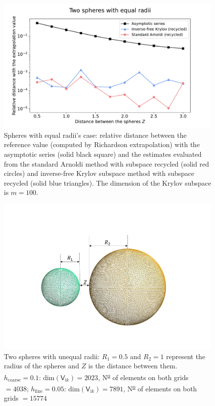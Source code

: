 \begin{figure}[H]
    \centering
    \includegraphics[scale = 0.5]{figures/relative_distance_equal_radii.pdf}
    \caption{Spheres with equal radii's case: relative distance between the reference value (computed by Richardson extrapolation) with the asymptotic series (solid black square)  
    and the estimates evaluated from the standard Arnoldi method with subspace recycled (solid red circles) and inverse-free Krylov subspace method 
    with subspace recycled (solid blue triangles). The dimension of the Krylov subspace is $m = 100$.}
    \label{equal_radii_rel_dist}
\end{figure}
 
\begin{figure}[H]
    \hspace*{2cm}\includegraphics[scale = 0.6]{figures/Grid_two_spheres_unequal_radii.png}
    \caption{Two spheres with unequal radii: $R_{1} = 0.5$ and $R_{2} = 1$ represent the radius of the spheres and $Z$ is the distance between them.
    $h_{\text{coarse}} = 0.1$: $\text{dim}(\mathsf{V}_{\mathrm{i}k}) = 2023$,  N\textsuperscript{\underline{o}} of elements on both grids $ = 4038$;
    $h_{\text{fine}} = 0.05$: $\text{dim}(\mathsf{V}_{\mathrm{i}k}) = 7891$,  N\textsuperscript{\underline{o}} of elements on both grids $ = 15774$}
    \label{Two spheres with unequal radii}
\end{figure}


